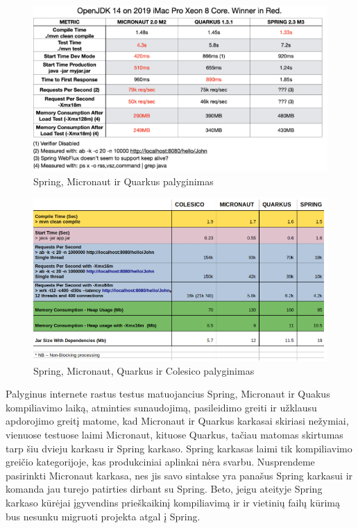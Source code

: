 \documentclass{VUMIFPSkursinis}
\begin{document}
			\begin{figure}[H]
			\includegraphics[scale=0.85]{img/one}
			\caption{Spring, Micronaut ir Quarkus palyginimas} %
			\label{img:kurimoProcesas}
			\end{figure}
			\begin{figure}[H]
			\includegraphics[scale=0.7]{img/two}
			\caption{Spring, Micronaut, Quarkus ir Colesico palyginimas} %
			\label{img:kurimoProcesas}
			\end{figure}
		Palyginus internete rastus testus matuojancius Spring, Micronaut ir Quakus kompiliavimo laiką, atminties sunaudojimą, pasileidimo greiti ir užklausu apdorojimo greitį
		matome, kad Micronaut ir Quarkus karkasai skiriasi nežymiai, vienuose testuose laimi Micronaut, kituose Quarkus, tačiau matomas  skirtumas tarp šiu dvieju karkasu ir Spring karkaso.
		Spring karkasas laimi tik kompiliavimo greičio kategorijoje, kas produkciniai aplinkai nėra svarbu.
		Nusprendeme pasirinkti Micronaut karkasa, nes jis savo sintakse yra panašus Spring karkasui ir komanda jau turejo patirties dirbant su Spring.
		Beto, jeigu ateityje Spring karkaso kūrėjai įgyvendins prieškaikinį kompiliavimą ir ir vietinių failų kūrimą bus nesunku migruoti projekta atgal į Spring.
\end{document}
